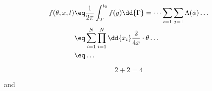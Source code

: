 \documentclass[class=../config/class, crop=false]{standalone}
\begin{document}
\pagestyle{fancy}
 
    \Blinddocument
    
    \blindmathpaper

    \begin{align}
        f(\theta,x,t) &\eq \frac{1}{2\pi}\int_{T}^{t_0}f(y) \dd{\Gamma} = \dots \sum_{i=1}\sum_{j=1}\Lambda (\phi)\dots \label{eq:teste}\\
        &\eq \sum_{i=1}^{N}\prod_{i=1}^{N} \dd{x_i} \frac{2}{4x} \cdot \theta \dots \nonumber \\
        &\eq \dots
    \end{align}
    
    \begin{equation}
        2 + 2 = 4
    \end{equation}
    
    and  
    \lipsum[1]
\end{document}
